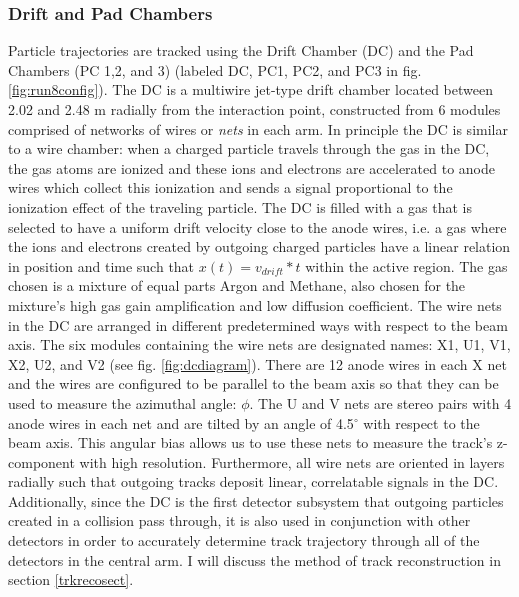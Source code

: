 \subsubsection{Drift and Pad Chambers}
\label{sect:dcpc}
Particle trajectories are tracked using the Drift Chamber (DC) and the Pad Chambers (PC 1,2, and 3)\citep{DCfocus} (labeled DC, PC1, PC2, and PC3 in fig. \ref{fig:run8config}). The DC is a multiwire jet-type drift chamber located between 2.02 and 2.48 m radially from the interaction point, constructed from 6 modules comprised of networks of wires or \textit{nets} in each arm. In principle the DC is similar to a wire chamber: when a charged particle travels through the gas in the DC, the gas atoms are ionized and these ions and electrons are accelerated to anode wires which collect this ionization and sends a signal proportional to the ionization effect of the traveling particle. The DC is filled with a gas that is selected to have a uniform drift velocity close to the anode wires, i.e. a gas where the ions and electrons created by outgoing charged particles have a linear relation in position and time such that $x(t) = v_{drift} * t$ within the active region. The gas chosen is a mixture of equal parts Argon and Methane, also chosen for the mixture's high gas gain amplification and low diffusion coefficient. The wire nets in the DC are arranged in different predetermined ways with respect to the beam axis. The six modules containing the wire nets are designated names: X1, U1, V1, X2, U2, and V2 (see fig. \ref{fig:dcdiagram}). There are 12 anode wires in each X net and the wires are configured to be parallel to the beam axis so that they can be used to measure the azimuthal angle: $\phi$. The U and V nets are stereo pairs with 4 anode wires in each net and are tilted by an angle of 4.5$^\circ$ with respect to the beam axis. This angular bias allows us to use these nets to measure the track's z-component with high resolution. Furthermore, all wire nets are oriented in layers radially such that outgoing tracks deposit linear, correlatable signals in the DC. Additionally, since the DC is the first detector subsystem that outgoing particles created in a collision pass through, it is also used in conjunction with other detectors in order to accurately determine track trajectory through all of the detectors in the central arm. I will discuss the method of track reconstruction in section \ref{trkrecosect}.


